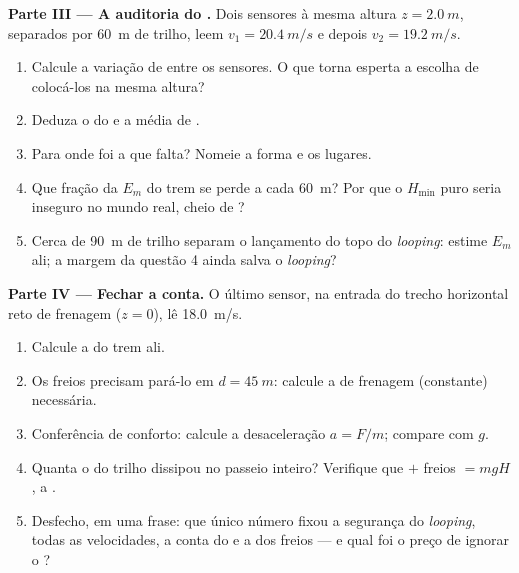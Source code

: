 \begin{problem}
\medskip
\noindent\textbf{Parte III --- A auditoria do .}
Dois sensores à mesma altura $z = \qty{2.0}{m}$, separados por
\qty{60}{m} de trilho, leem $v_1 = \qty{20.4}{m/s}$ e depois
$v_2 = \qty{19.2}{m/s}$.
\begin{enumerate}[resume]
  \item Calcule a variação de  entre os sensores. O que
        torna esperta a escolha de colocá-los na mesma altura?
  \item Deduza o  do  e a  média de .
  \item Para onde foi a  que falta? Nomeie a forma e os lugares.
  \item Que fração da $E_m$ do trem se perde a cada \qty{60}{m}? Por que
        o $H_{\min}$ puro seria inseguro no mundo real, cheio de ?
  \item Cerca de \qty{90}{m} de trilho separam o lançamento do topo do
        \emph{looping}: estime $E_m$ ali; a margem da questão 4 ainda
        salva o \emph{looping}?
\end{enumerate}

\medskip
\noindent\textbf{Parte IV --- Fechar a conta.}
O último sensor, na entrada do trecho horizontal reto de frenagem
($z = 0$), lê \qty{18.0}{m/s}.
\begin{enumerate}[resume]
  \item Calcule a  do trem ali.
  \item Os freios precisam pará-lo em $d = \qty{45}{m}$: calcule a 
        de frenagem (constante) necessária.
  \item Conferência de conforto: calcule a desaceleração $a = F/m$;
        compare com $g$.
  \item Quanta  o  do trilho dissipou no passeio inteiro?
        Verifique que  $+$ freios $= mgH$,  a .
  \item Desfecho, em uma frase: que único número fixou a segurança do
        \emph{looping}, todas as velocidades, a conta do  e a 
        dos freios --- e qual foi o preço de ignorar o ?
\end{enumerate}
\end{problem}
